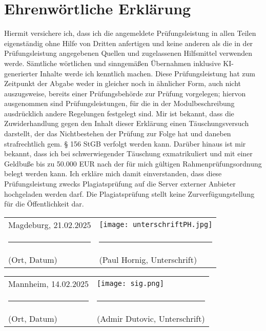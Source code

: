 \section*{Ehrenwörtliche Erklärung}

Hiermit versichere ich, dass ich die angemeldete Prüfungsleistung in allen Teilen eigenständig ohne Hilfe von Dritten anfertigen und keine anderen als die in der Prüfungsleistung angegebenen Quellen und zugelassenen Hilfsmittel verwenden werde. Sämtliche wörtlichen und sinngemäßen Übernahmen inklusive KI-generierter Inhalte werde ich kenntlich machen.
Diese Prüfungsleistung hat zum Zeitpunkt der Abgabe weder in gleicher noch in ähnlicher Form, auch nicht auszugsweise, bereits einer Prüfungsbehörde zur Prüfung vorgelegen; hiervon ausgenommen sind Prüfungsleistungen, für die in der Modulbeschreibung ausdrücklich andere Regelungen festgelegt sind.
Mir ist bekannt, dass die Zuwiderhandlung gegen den Inhalt dieser Erklärung einen Täuschungsversuch darstellt, der das Nichtbestehen der Prüfung zur Folge hat und daneben strafrechtlich gem. § 156 StGB verfolgt werden kann. Darüber hinaus ist mir bekannt, dass ich bei schwerwiegender Täuschung exmatrikuliert und mit einer Geldbuße bis zu 50.000 EUR nach der für mich gültigen Rahmenprüfungsordnung belegt werden kann.
Ich erkläre mich damit einverstanden, dass diese Prüfungsleistung zwecks Plagiatsprüfung auf die Server externer Anbieter hochgeladen werden darf. Die Plagiatsprüfung stellt keine Zurverfügungstellung für die Öffentlichkeit dar.

\vspace{1cm}




\begin{tabular}{m{7cm} m{7cm}}
    \vspace{1.3cm}Magdeburg, 21.02.2025 & \vspace{0.1cm} \texttt{[image: unterschriftPH.jpg]} \\
    \multicolumn{1}{c}{\hspace{-2cm}\rule{5cm}{0.4pt}} & \multicolumn{1}{c}{\hspace{-2cm}\rule{5cm}{0.4pt}} \\
    (Ort, Datum) & (Paul Hornig, Unterschrift) \\
\end{tabular}

\begin{tabular}{m{7cm} m{7cm}}
    \vspace{1.3cm}Mannheim, 14.02.2025 & \vspace{0.2cm}\texttt{[image: sig.png]} \\
    \multicolumn{1}{c}{\hspace{-2cm}\rule{5cm}{0.4pt}} & \multicolumn{1}{c}{\hspace{-2cm}\rule{5cm}{0.4pt}} \\
    (Ort, Datum) & (Admir Dutovic, Unterschrift) \\
\end{tabular}

